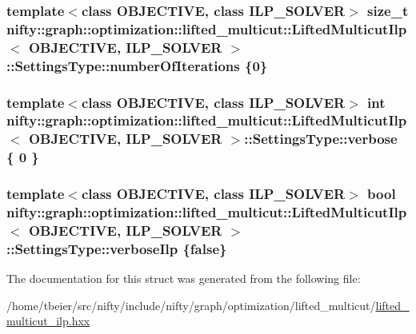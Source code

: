 \subsubsection[{number\+Of\+Iterations}]{\setlength{\rightskip}{0pt plus 5cm}template$<$class O\+B\+J\+E\+C\+T\+I\+V\+E, class I\+L\+P\+\_\+\+S\+O\+L\+V\+E\+R$>$ size\+\_\+t {\bf nifty\+::graph\+::optimization\+::lifted\+\_\+multicut\+::\+Lifted\+Multicut\+Ilp}$<$ O\+B\+J\+E\+C\+T\+I\+V\+E, I\+L\+P\+\_\+\+S\+O\+L\+V\+E\+R $>$\+::Settings\+Type\+::number\+Of\+Iterations \{0\}}\label{structnifty_1_1graph_1_1optimization_1_1lifted__multicut_1_1LiftedMulticutIlp_1_1SettingsType_a1d88859439cbbdb8898528cd97345c27}
\hypertarget{structnifty_1_1graph_1_1optimization_1_1lifted__multicut_1_1LiftedMulticutIlp_1_1SettingsType_a582087f74af07aed4406832115226c04}{}
\subsubsection[{verbose}]{\setlength{\rightskip}{0pt plus 5cm}template$<$class O\+B\+J\+E\+C\+T\+I\+V\+E, class I\+L\+P\+\_\+\+S\+O\+L\+V\+E\+R$>$ int {\bf nifty\+::graph\+::optimization\+::lifted\+\_\+multicut\+::\+Lifted\+Multicut\+Ilp}$<$ O\+B\+J\+E\+C\+T\+I\+V\+E, I\+L\+P\+\_\+\+S\+O\+L\+V\+E\+R $>$\+::Settings\+Type\+::verbose \{ 0 \}}\label{structnifty_1_1graph_1_1optimization_1_1lifted__multicut_1_1LiftedMulticutIlp_1_1SettingsType_a582087f74af07aed4406832115226c04}
\hypertarget{structnifty_1_1graph_1_1optimization_1_1lifted__multicut_1_1LiftedMulticutIlp_1_1SettingsType_a731e01272e2770a11440842b132bbef9}{}
\subsubsection[{verbose\+Ilp}]{\setlength{\rightskip}{0pt plus 5cm}template$<$class O\+B\+J\+E\+C\+T\+I\+V\+E, class I\+L\+P\+\_\+\+S\+O\+L\+V\+E\+R$>$ bool {\bf nifty\+::graph\+::optimization\+::lifted\+\_\+multicut\+::\+Lifted\+Multicut\+Ilp}$<$ O\+B\+J\+E\+C\+T\+I\+V\+E, I\+L\+P\+\_\+\+S\+O\+L\+V\+E\+R $>$\+::Settings\+Type\+::verbose\+Ilp \{false\}}\label{structnifty_1_1graph_1_1optimization_1_1lifted__multicut_1_1LiftedMulticutIlp_1_1SettingsType_a731e01272e2770a11440842b132bbef9}


The documentation for this struct was generated from the following file\+:\begin{DoxyCompactItemize}
\item 
/home/tbeier/src/nifty/include/nifty/graph/optimization/lifted\+\_\+multicut/\hyperlink{lifted__multicut__ilp_8hxx}{lifted\+\_\+multicut\+\_\+ilp.\+hxx}\end{DoxyCompactItemize}

